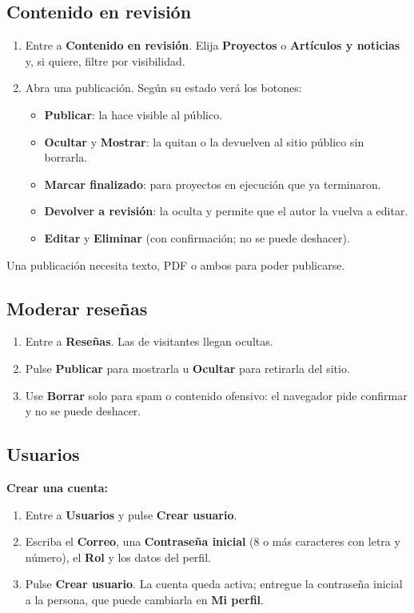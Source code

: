 \documentclass[11pt,a4paper]{article}
\newcommand{\boton}[1]{\textbf{\textcolor{siiisazul}{#1}}}
\begin{document}
\subsection{Contenido en revisi\'on}
\begin{enumerate}
  \item Entre a \boton{Contenido en revisi\'on}. Elija \boton{Proyectos} o \boton{Art\'iculos y noticias} y, si quiere,
    filtre por visibilidad.
  \item Abra una publicaci\'on. Seg\'un su estado ver\'a los botones:
    \begin{itemize}
      \item \boton{Publicar}: la hace visible al p\'ublico.
      \item \boton{Ocultar} y \boton{Mostrar}: la quitan o la devuelven al sitio p\'ublico sin borrarla.
      \item \boton{Marcar finalizado}: para proyectos en ejecuci\'on que ya terminaron.
      \item \boton{Devolver a revisi\'on}: la oculta y permite que el autor la vuelva a editar.
      \item \boton{Editar} y \boton{Eliminar} (con confirmaci\'on; no se puede deshacer).
    \end{itemize}
\end{enumerate}
Una publicaci\'on necesita texto, PDF o ambos para poder publicarse.


\subsection{Moderar rese\~nas}
\begin{enumerate}
  \item Entre a \boton{Rese\~nas}. Las de visitantes llegan ocultas.
  \item Pulse \boton{Publicar} para mostrarla u \boton{Ocultar} para retirarla del sitio.
  \item Use \boton{Borrar} solo para spam o contenido ofensivo: el navegador pide confirmar y no se puede deshacer.
\end{enumerate}


\subsection{Usuarios}
\textbf{Crear una cuenta:}
\begin{enumerate}
  \item Entre a \boton{Usuarios} y pulse \boton{Crear usuario}.
  \item Escriba el \textbf{Correo}, una \textbf{Contrase\~na inicial} (8 o m\'as caracteres con letra y n\'umero), el
    \textbf{Rol} y los datos del perfil.
  \item Pulse \boton{Crear usuario}. La cuenta queda activa; entregue la contrase\~na inicial a la persona, que puede
    cambiarla en \boton{Mi perfil}.
\end{enumerate}
\end{document}
